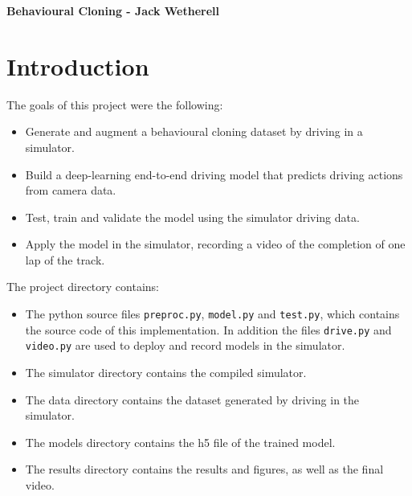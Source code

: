 \documentclass[letterpaper,12pt]{article}
\begin{document}
\title{}
\author{}
\date{}


\begin{center}
\textbf{Behavioural Cloning  - Jack Wetherell} \\
\end{center}


\section{Introduction}
The goals of this project were the following:
\begin{itemize}
\item Generate and augment a behavioural cloning dataset by driving in a simulator.
\item Build a deep-learning end-to-end driving model that predicts driving actions from camera data.
\item Test, train and validate the model using the simulator driving data.
\item Apply the model in the simulator, recording a video of the completion of one lap of the track.
\end{itemize}
The project directory contains:
\begin{itemize}
\item The python source files \texttt{preproc.py}, \texttt{model.py} and \texttt{test.py}, which contains the source code of this implementation. In addition the files \texttt{drive.py} and \texttt{video.py} are used to deploy and record models in the simulator. 
\item The simulator directory contains the compiled simulator. 
\item The data directory contains the dataset generated by driving in the simulator.
\item The models directory contains the h5 file of the trained model.
\item The results directory contains the results and figures, as well as the final video. 
\end{itemize}
\end{document}
